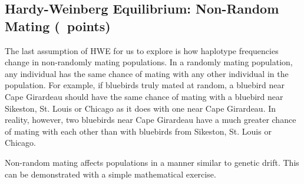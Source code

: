 \documentclass[11pt, addpoints]{exam}
\begin{document}
\subsection*{Hardy-Weinberg Equilibrium: Non-Random Mating (\numpoints\ points)}

The last assumption of HWE for us to explore is how haplotype
frequencies change in non-randomly mating populations. In a randomly
mating population, any individual has the same chance of mating with any
other individual in the population. For example, if bluebirds truly
mated at random, a bluebird near Cape Girardeau should have the same
chance of mating with a bluebird near Sikeston, St. Louis or Chicago as
it does with one near Cape Girardeau. In reality, however, two bluebirds
near Cape Girardeau have a much greater chance of mating with each other
than with bluebirds from Sikeston, St. Louis or Chicago.

Non-random mating affects populations in a manner similar to genetic
drift. This can be demonstrated with a simple mathematical exercise.
\end{document}
